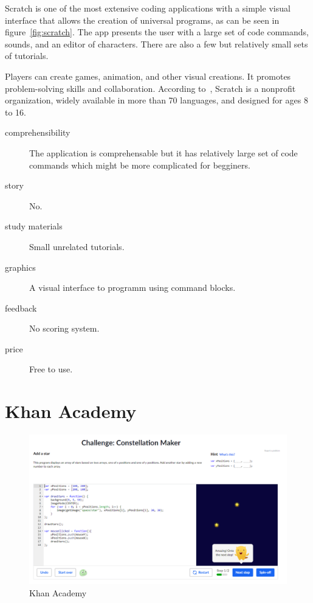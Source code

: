 Scratch is one of the most extensive coding applications with a simple visual interface that allows the creation of universal programs, as can be seen in figure~\ref{fig:scratch}.
The app presents the user with a large set of code commands, sounds, and an editor of characters.
There are also a few but relatively small sets of tutorials.

Players can create games, animation, and other visual creations.
It promotes problem-solving skills and collaboration.
According to~\cite{a2022_scratch}, Scratch is a nonprofit organization, widely available in more than 70 languages, and designed for ages 8 to 16.

\begin{description}
    \item[comprehensibility] The application is comprehensable but it has relatively large set of code commands which might be more complicated for begginers.
    \item[story] No.    
    \item[study materials] Small unrelated tutorials.
    \item[graphics] A visual interface to programm using command blocks.
    \item[feedback] No scoring system. 
    \item[price] Free to use.
\end{description}

\pagebreak
\section{Khan Academy}
\label{similar-games:khan-academy}

\begin{figure}
    \centering
    \includegraphics[width=1\linewidth]{assets/similar-games/khanacademy.png}
    \caption{Khan Academy~\cite{a2022_khan}}
    \label{fig:khanacademy}
\end{figure}

